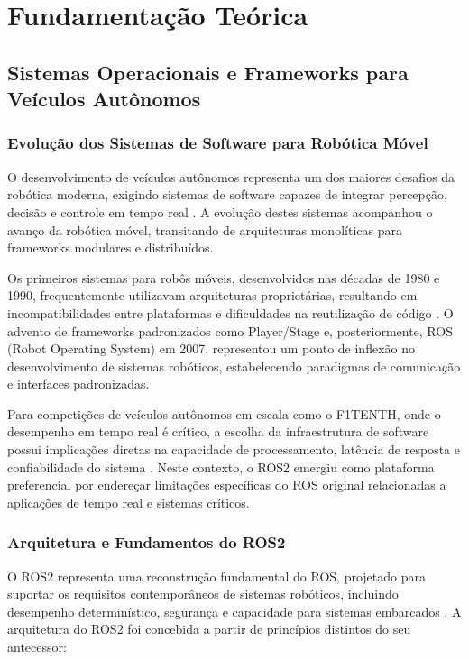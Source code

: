 \chapter{Fundamentação Teórica}\label{cap:ferramentas}

\section{Sistemas Operacionais e Frameworks para Veículos Autônomos}

\subsection{Evolução dos Sistemas de Software para Robótica Móvel}

O desenvolvimento de veículos autônomos representa um dos maiores desafios da
robótica moderna, exigindo sistemas de software capazes de integrar percepção,
decisão e controle em tempo real \cite{quigley2009ros}. A evolução destes
sistemas acompanhou o avanço da robótica móvel, transitando de arquiteturas
monolíticas para frameworks modulares e distribuídos.

Os primeiros sistemas para robôs móveis, desenvolvidos nas décadas de 1980 e
1990, frequentemente utilizavam arquiteturas proprietárias, resultando em
incompatibilidades entre plataformas e dificuldades na reutilização de código
\cite{kortenkamp2016robotic}. O advento de frameworks padronizados como
Player/Stage \cite{gerkey2003player} e, posteriormente, ROS (Robot Operating
System) em 2007, representou um ponto de inflexão no desenvolvimento de
sistemas robóticos, estabelecendo paradigmas de comunicação e interfaces
padronizadas.

Para competições de veículos autônomos em escala como o F1TENTH, onde o
desempenho em tempo real é crítico, a escolha da infraestrutura de software
possui implicações diretas na capacidade de processamento, latência de resposta
e confiabilidade do sistema \cite{OKelly2020F1TENTH}. Neste contexto, o ROS2
emergiu como plataforma preferencial por endereçar limitações específicas do
ROS original relacionadas a aplicações de tempo real e sistemas críticos.

\subsection{Arquitetura e Fundamentos do ROS2}

O ROS2 representa uma reconstrução fundamental do ROS, projetado para suportar
os requisitos contemporâneos de sistemas robóticos, incluindo desempenho
determinístico, segurança e capacidade para sistemas embarcados
\cite{macenski2022robot}. A arquitetura do ROS2 foi concebida a partir de
princípios distintos do seu antecessor:

